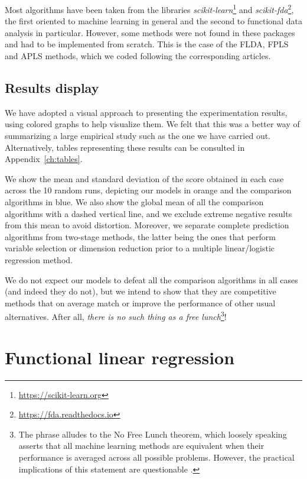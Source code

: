 Most algorithms have been taken from the libraries \textit{scikit-learn}\footnote{\url{https://scikit-learn.org}} and \textit{scikit-fda}\footnote{\url{https://fda.readthedocs.io}}, the first oriented to machine learning in general and the second to functional data analysis in particular. However, some methods were not found in these packages and had to be implemented from scratch. This is the case of the FLDA, FPLS and APLS methods, which we coded following the corresponding articles.

\subsection*{Results display}

We have adopted a visual approach to presenting the experimentation results, using colored graphs to help visualize them. We felt that this was a better way of summarizing a large empirical study such as the one we have carried out. Alternatively, tables representing these results can be consulted in Appendix~\ref{ch:tables}.

We show the mean and standard deviation of the score obtained in each case across the 10 random runs, depicting our models in orange and the comparison algorithms in blue. We also show the global mean of all the comparison algorithms with a dashed vertical line, and we exclude extreme negative results from this mean to avoid distortion. Moreover, we separate complete prediction algorithms from two-stage methods, the latter being the ones that perform variable selection or dimension reduction prior to a multiple linear/logistic regression method.

We do not expect our models to defeat all the comparison algorithms in all cases (and indeed they do not), but we intend to show that they are competitive methods that on average match or improve the performance of other usual alternatives. After all, \textit{there is no such thing as a free lunch}\footnote{The phrase alludes to the No Free Lunch theorem, which loosely speaking asserts that all machine learning methods are equivalent when their performance is averaged across all possible problems. However, the practical implications of this statement are questionable \citep[see e.g.][]{giraud2005toward}.}!

\section{Functional linear regression}\label{sec:experiments-linear}

